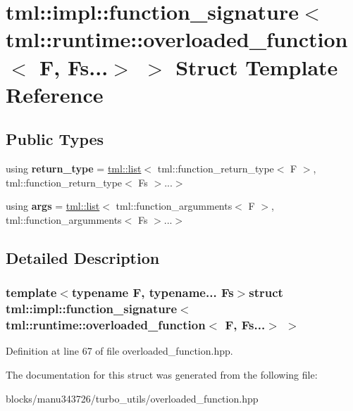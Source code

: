 \hypertarget{structtml_1_1impl_1_1function__signature_3_01tml_1_1runtime_1_1overloaded__function_3_01_f_00_01_fs_8_8_8_4_01_4}{\section{tml\+:\+:impl\+:\+:function\+\_\+signature$<$ tml\+:\+:runtime\+:\+:overloaded\+\_\+function$<$ F, Fs...$>$ $>$ Struct Template Reference}
\label{structtml_1_1impl_1_1function__signature_3_01tml_1_1runtime_1_1overloaded__function_3_01_f_00_01_fs_8_8_8_4_01_4}
}
\subsection*{Public Types}
\begin{DoxyCompactItemize}
\item 
\hypertarget{structtml_1_1impl_1_1function__signature_3_01tml_1_1runtime_1_1overloaded__function_3_01_f_00_01_fs_8_8_8_4_01_4_a7282747753804ae78e0564fec61724ca}{using {\bfseries return\+\_\+type} = \hyperlink{structtml_1_1list}{tml\+::list}$<$ tml\+::function\+\_\+return\+\_\+type$<$ F $>$, tml\+::function\+\_\+return\+\_\+type$<$ Fs $>$...$>$}\label{structtml_1_1impl_1_1function__signature_3_01tml_1_1runtime_1_1overloaded__function_3_01_f_00_01_fs_8_8_8_4_01_4_a7282747753804ae78e0564fec61724ca}

\item 
\hypertarget{structtml_1_1impl_1_1function__signature_3_01tml_1_1runtime_1_1overloaded__function_3_01_f_00_01_fs_8_8_8_4_01_4_a1ac0eab64a09914df2209b4d7b5618a1}{using {\bfseries args} = \hyperlink{structtml_1_1list}{tml\+::list}$<$ tml\+::function\+\_\+argumments$<$ F $>$, tml\+::function\+\_\+argumments$<$ Fs $>$...$>$}\label{structtml_1_1impl_1_1function__signature_3_01tml_1_1runtime_1_1overloaded__function_3_01_f_00_01_fs_8_8_8_4_01_4_a1ac0eab64a09914df2209b4d7b5618a1}

\end{DoxyCompactItemize}


\subsection{Detailed Description}
\subsubsection*{template$<$typename F, typename... Fs$>$struct tml\+::impl\+::function\+\_\+signature$<$ tml\+::runtime\+::overloaded\+\_\+function$<$ F, Fs...$>$ $>$}



Definition at line 67 of file overloaded\+\_\+function.\+hpp.



The documentation for this struct was generated from the following file\+:\begin{DoxyCompactItemize}
\item 
blocks/manu343726/turbo\+\_\+utils/overloaded\+\_\+function.\+hpp\end{DoxyCompactItemize}
